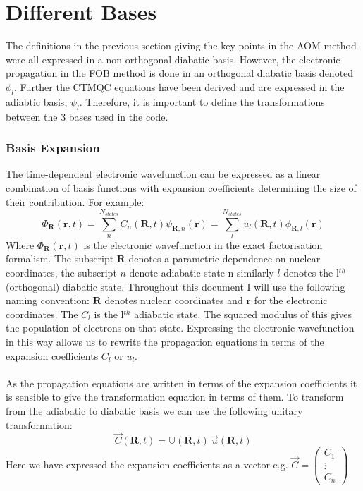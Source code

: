 \section{Different Bases}
The definitions in the previous section giving the key points in the AOM method were all expressed in a non-orthogonal diabatic basis. However, the electronic propagation in the FOB method is done in an orthogonal diabatic basis denoted $\phi_{l}$. Further the CTMQC equations have been derived and are expressed in the adiabtic basis, $\psi_{l}$. Therefore, it is important to define the transformations between the 3 bases used in the code.
\subsubsection{Basis Expansion}
The time-dependent electronic wavefunction can be expressed as a linear combination of basis functions with expansion coefficients determining the size of their contribution. For example:
\begin{equation}
  \Phi_{\textbf{R}}(\textbf{r}, t) = \sum_{n}^{N_{states}}C_{n}(\textbf{R}, t) \psi_{\textbf{R}, n}(\textbf{r}) = \sum_{l}^{N_{states}} u_{l}(\textbf{R}, t) \phi_{\textbf{R}, l}(\textbf{r})
\end{equation}
Where $\Phi_{\textbf{R}}(\textbf{r}, t)$ is the electronic wavefunction in the exact factorisation formalism. The subscript $\textbf{R}$ denotes a parametric dependence on nuclear coordinates, the subscript $n$ denote adiabatic state n similarly $l$ denotes the l$^{th}$ (orthogonal) diabatic state. Throughout this document I will use the following naming convention: $\textbf{R}$ denotes nuclear coordinates and $\textbf{r}$ for the electronic coordinates. The $C_{l}$ is the l$^{th}$ adiabatic state. The squared modulus of this gives the population of electrons on that state. Expressing the electronic wavefunction in this way allows us to rewrite the propagation equations in terms of the expansion coefficients $C_{l}$ or $u_{l}$.
\\\\
As the propagation equations are written in terms of the expansion coefficients it is sensible to give the transformation equation in terms of them. To transform from the adiabatic to diabatic basis we can use the following unitary transformation:
\begin{equation}
  \vec{C}(\textbf{R}, t) = \mathbb{U}(\textbf{R}, t) \  \vec{u}(\textbf{R}, t)
  \label{eq:ad_to_di}
\end{equation}
Here we have expressed the expansion coefficients as a vector e.g. $\vec{C} = \left( \begin{array}{c}
C_1 \\
\vdots \\
C_n
\end{array}\right)$
